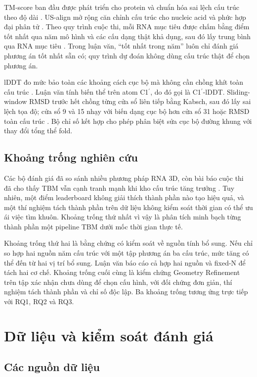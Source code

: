 \documentclass[12pt,a4paper,oneside]{report}
\newcommand{\cprime}{C1$^{\prime}$}
\begin{document}
TM-score ban đầu được phát triển cho protein và chuẩn hóa sai lệch cấu trúc theo độ dài
\cite{tm_score}. US-align mở rộng căn chỉnh cấu trúc cho nucleic acid và phức hợp
đại phân tử \cite{usalign}. Theo quy trình cuộc thi, mỗi RNA mục tiêu được chấm bằng điểm tốt
nhất qua năm mô hình và các cấu dạng thật khả dụng, sau đó lấy trung bình qua RNA mục tiêu
\cite{competition_paper}. Trong luận văn, ``tốt nhất trong năm'' luôn chỉ đánh giá phương án tốt nhất sẵn có;
quy trình dự đoán không dùng cấu trúc thật để chọn phương án.

lDDT đo mức bảo toàn các khoảng cách cục bộ mà không cần chồng khít toàn cấu trúc
\cite{lddt}. Luận văn tính biến thể trên atom \cprime{}, do đó gọi là
\cprime{}-lDDT. Sliding-window RMSD trước hết chồng từng cửa sổ liên tiếp bằng Kabsch,
sau đó lấy sai lệch tọa độ; cửa sổ 9 và 15 nhạy với biến dạng cục bộ hơn cửa sổ 31 hoặc
RMSD toàn cấu trúc \cite{kabsch}. Bộ chỉ số kết hợp cho phép phân biệt sửa cục bộ đường khung
với thay đổi tổng thể fold.

\section{Khoảng trống nghiên cứu}

Các bộ đánh giá đã so sánh nhiều phương pháp RNA 3D, còn bài báo cuộc thi đã cho thấy TBM
vẫn cạnh tranh mạnh khi kho cấu trúc tăng trưởng
\cite{state_of_rnart,competition_paper}. Tuy nhiên, một điểm leaderboard không giải
thích thành phần nào tạo hiệu quả, và một thí nghiệm tách thành phần trên dữ liệu không kiểm soát thời gian
có thể ưu ái việc tìm khuôn. Khoảng trống thứ nhất vì vậy là phân tích minh bạch từng thành phần một
pipeline TBM dưới mốc thời gian thực tế.

Khoảng trống thứ hai là bằng chứng có kiểm soát về nguồn tính bổ sung. Nếu chỉ so
hợp hai nguồn năm cấu trúc với một tập phương án ba cấu trúc, mức tăng có thể đến từ hai vị trí bổ sung.
Luận văn báo cáo cả hợp hai nguồn và fixed-N để tách hai cơ chế. Khoảng trống cuối cùng là kiểm
chứng Geometry Refinement trên tập xác nhận chưa dùng để chọn cấu hình, với đối chứng đơn
giản, thí nghiệm tách thành phần và chỉ số
độc lập. Ba khoảng trống tương ứng trực tiếp với RQ1, RQ2 và RQ3.

\chapter{Dữ liệu và kiểm soát đánh giá}
\label{chap:data_vi}

\section{Các nguồn dữ liệu}
\end{document}
